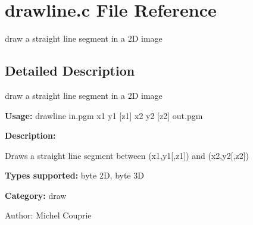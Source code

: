 \section{drawline.c File Reference}
\label{drawline_8c}
draw a straight line segment in a 2D image  




\label{_details}
\subsection{Detailed Description}
draw a straight line segment in a 2D image 

{\bf Usage:} drawline in.pgm x1 y1 [z1] x2 y2 [z2] out.pgm

{\bf Description:}

Draws a straight line segment between (x1,y1[,z1]) and (x2,y2[,z2])

{\bf Types supported:} byte 2D, byte 3D

{\bf Category:} draw

\begin{Desc}
\item[Author:]Michel Couprie \end{Desc}
